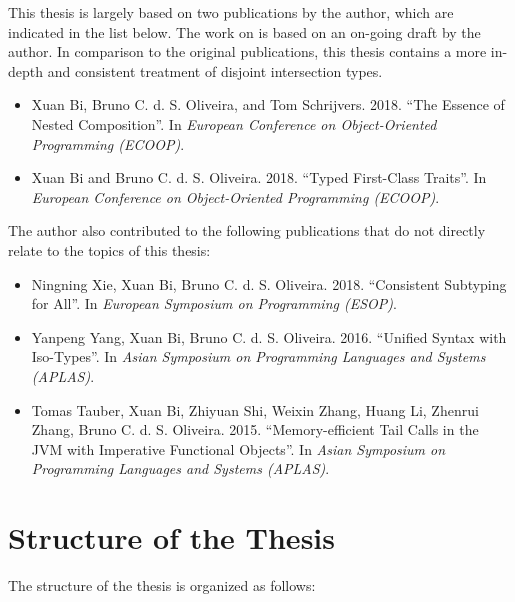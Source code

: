 This thesis is largely based on two publications by the author, which are
indicated in the list below. The work on \fnamee is based on an on-going draft
by the author. In comparison to the original publications, this thesis contains
a more in-depth and consistent treatment of disjoint intersection types.

\begin{itemize}
\item Xuan Bi, Bruno C. d. S. Oliveira, and Tom Schrijvers. 2018. ``The Essence
  of Nested Composition''. In \textit{European Conference on Object-Oriented Programming (ECOOP)}.
\item Xuan Bi and Bruno C. d. S. Oliveira. 2018. ``Typed First-Class Traits''.
  In \textit{European Conference on Object-Oriented Programming (ECOOP)}.
\end{itemize}


The author also contributed to the following publications that do not directly
relate to the topics of this thesis:
\begin{itemize}
\item Ningning Xie, Xuan Bi, Bruno C. d. S. Oliveira. 2018. ``Consistent Subtyping for All''.
  In \textit{European Symposium on Programming (ESOP)}.
\item Yanpeng Yang, Xuan Bi, Bruno C. d. S. Oliveira. 2016. ``Unified Syntax with
  Iso-Types''. In \textit{Asian Symposium on Programming Languages and
    Systems (APLAS)}.
\item Tomas Tauber, Xuan Bi, Zhiyuan Shi, Weixin Zhang, Huang Li, Zhenrui Zhang,
  Bruno C. d. S. Oliveira. 2015. ``Memory-efficient Tail Calls in the JVM with
  Imperative Functional Objects''. In \textit{Asian Symposium on
    Programming Languages and Systems (APLAS)}.
\end{itemize}


\section{Structure of the Thesis}

The structure of the thesis is organized as follows:

